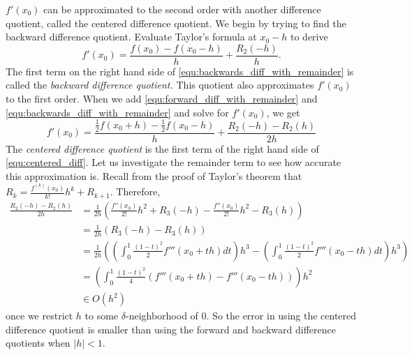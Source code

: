 $f'(x_0)$ can be approximated to the second order with another difference quotient, called the centered difference quotient.  We begin by trying to find the backward difference quotient.
Evaluate Taylor's formula at $x_0-h$ to derive
%
\begin{equation}\label{equ:backwards_diff_with_remainder}
f'(x_0) = \frac{f(x_0)-f(x_0-h)}{h} + \frac{R_2(-h)}{h}.
\end{equation}
%
The first term on the right hand side of \eqref{equ:backwards_diff_with_remainder} is called the \emph{backward difference quotient.}
This quotient also approximates $f'(x_0)$ to the first order.
When we add \eqref{equ:forward_diff_with_remainder} and \eqref{equ:backwards_diff_with_remainder} and solve for $f'(x_0)$, we get
%
\begin{equation}\label{equ:centered_diff}
f'(x_0) = \frac{\frac{1}{2}f(x_0+h) - \frac{1}{2}f(x_0-h)}{h} + \frac{R_2(-h) - R_2(h)}{2h}
\end{equation}
%
The \emph{centered difference quotient} is the first term of the right hand side of \eqref{equ:centered_diff}.
Let us investigate the remainder term to see how accurate this approximation is.
Recall from the proof of Taylor's theorem that $R_k = \frac{f^{(k)}(x_0)}{k!}h^k + R_{k+1}$. Therefore,
%
\begin{align*}
\frac{R_2(-h) - R_2(h)}{2h} &= \frac{1}{2h}\left(\frac{f''(x_0)}{2!}h^2 + R_{3}(-h) - \frac{f''(x_0)}{2!}h^2 - R_{3}(h) \right)\\
&= \frac{1}{2h} ( R_3(-h)-R_3(h))\\
&= \frac{1}{2h}\left(  \left( \int_0^1 \frac{(1-t)^2}{2} f'''(x_0+th) dt \right) h^3  -  \left(\int_0^1 \frac{(1-t)^2}{2} f'''(x_0-th) dt \right) h^3  \right)\\
&= \left(  \int_0^1 \frac{(1-t)^2}{4}( f'''(x_0+th)-f'''(x_0-th)) \right)h^2\\
&{\in}   O(h^2)
\end{align*}
%
once we restrict $h$ to some $\delta$-neighborhood of 0.
So the error in using the centered difference quotient is smaller than using the forward and backward difference quotients when $|h|<1$.


